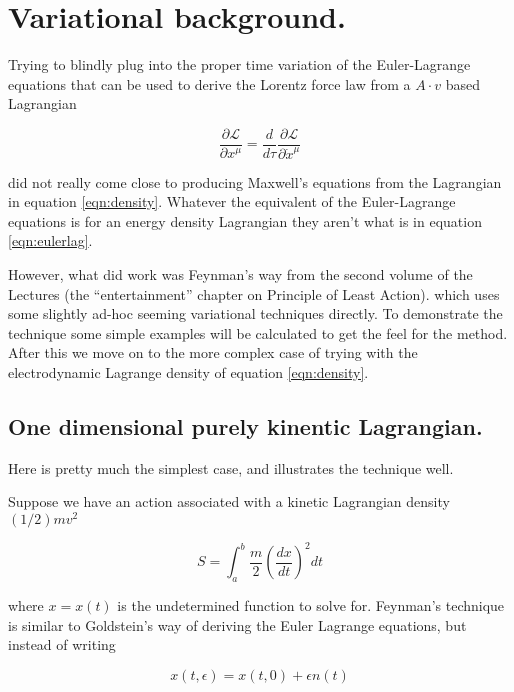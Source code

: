 \documentclass{article}
\newcommand{\LL}[0]{\mathcal{L}}
\newcommand{\PD}[2]{\frac{\partial {#2}}{\partial {#1}}}
\begin{document}
\section{ Variational background. }

Trying to blindly plug into the proper time variation of the Euler-Lagrange equations that can be used to derive the Lorentz force law from a $A \cdot v$ based Lagrangian

\begin{equation}\label{eqn:eulerlag}
\PD{x^\mu}{\LL} = \frac{d}{d\tau} \PD{\dot{x}^\mu}{\LL}
\end{equation}

did not really come close to producing Maxwell's equations from the Lagrangian in equation \ref{eqn:density}.  Whatever the equivalent of the Euler-Lagrange equations is for an energy density Lagrangian they aren't what is in equation \ref{eqn:eulerlag}.

However, what did work was Feynman's way from the second volume of the Lectures (the ``entertainment'' chapter on Principle of Least Action).
which uses some slightly ad-hoc seeming variational techniques directly.  To demonstrate the technique some simple examples
will be calculated to get the feel for the method.  After this we move on to the more complex case of trying with the electrodynamic Lagrange
density of equation \ref{eqn:density}.

\subsection{ One dimensional purely kinentic Lagrangian. }

Here is pretty much the simplest case, and illustrates the technique well.

Suppose we have an action associated with a kinetic Lagrangian density $(1/2) m v^2$

\begin{equation}\label{eqn:oneDimKinetic}
S = \int_a^b \frac{m}{2} { \left(\frac{dx}{dt}\right) }^2 dt
\end{equation}

where $x = x(t)$ is the undetermined function to solve for.  Feynman's technique is similar to Goldstein's way of deriving the Euler Lagrange equations, but instead of writing

\begin{equation*}
x(t, \epsilon) = x(t, 0) + \epsilon n(t)
\end{equation*}
\end{document}
